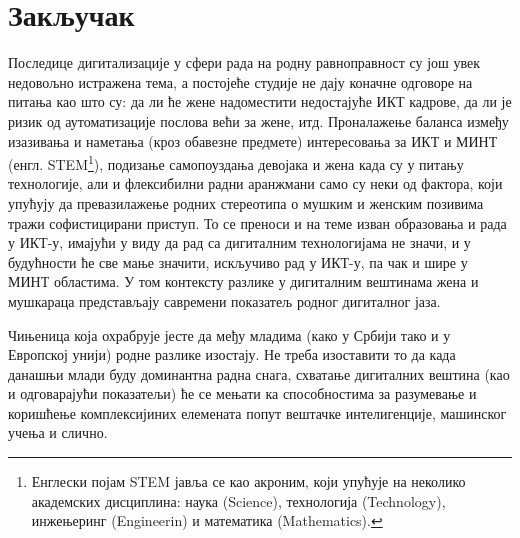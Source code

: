 \documentclass[a4paper]{article}
\begin{document}
\section{Закључак}
\label{sec:zakljucak}

Последице дигитализације у сфери рада на родну равноправност су још увек
недовољно истражена тема, а постојеће студије не дају коначне одговоре на питања као што
су: да ли ће жене надоместити недостајуће ИКТ кадрове, да ли је ризик од аутоматизације
послова већи за жене, итд. 
Проналажење баланса између изазивања и наметања (кроз обавезне предмете) интересовања за ИКТ и 
МИНТ (енгл. STEM\footnote{Енглески појам STEM јавља се као акроним, који 
упућује на неколико академских дисциплина: наука (Science), технологија (Technology), инжењеринг 
(Engineerin) и математика (Mathematics).}), подизање самопоуздања девојака и жена када су у питању
технологије, али и флексибилни радни аранжмани само су неки од фактора, који упућују да
превазилажење родних стереотипа о мушким и женским позивима тражи софистицирани приступ.
То се преноси и на теме изван образовања и рада у ИКТ-у, имајући у виду да рад са дигиталним
технологијама не значи, и у будућности ће све мање значити, искључиво рад у ИКТ-у, па чак и шире
у МИНТ областима. У том контексту разлике у дигиталним вештинама жена и мушкараца
представљају савремени показатељ родног дигиталног јаза. 

Чињеница која охрабрује јесте да међу младима (како у Србији тако и у Европској унији) родне 
разлике изостају. Не треба изоставити то да када данашњи млади буду доминантна радна снага, 
схватање дигиталних вештина (као и одговарајући показатељи) ће се мењати ка способностима за 
разумевање и коришћење комплексијиних елемената попут вештачке интелигенције, машинског учења и 
слично. 

\newpage
{}
\appendix
 

%
\end{document}
